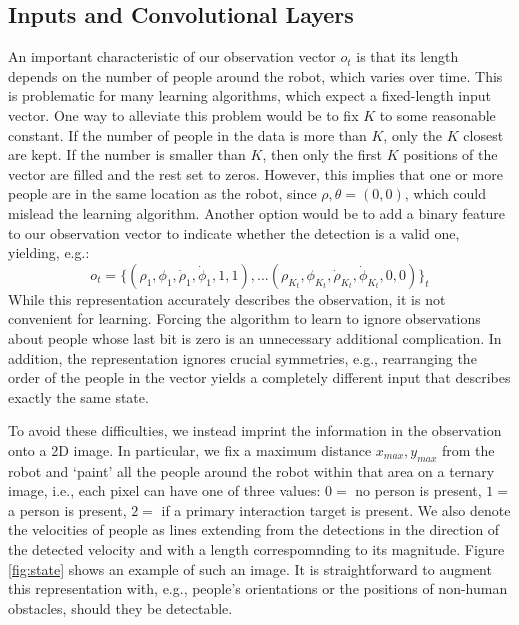 \documentclass[letterpaper, 10 pt, conference]{ieeeconf}
\begin{document}
\subsection{Inputs and Convolutional Layers \label{subsec:meth_inp}}
%
An important characteristic of our observation vector $o_t$ is that its length depends on
 the number of people around the robot, which varies over time.  This is problematic for many
learning algorithms, which expect a fixed-length input vector. One way to alleviate this problem would be to fix $K$ to some reasonable constant. If the number of people in the data is more than $K$, only the $K$ closest are kept. If the number is smaller than $K$, then only the first $K$ positions of the vector are filled and the rest set to zeros. However, this implies that one or more people are in the same location as the robot, since $\rho,\theta = (0,0)$, which could mislead the learning algorithm.  Another option would be to add a binary feature to our observation vector to indicate whether the detection is a valid one, yielding, e.g.:
\begin{equation}
 	o_t = \{(\rho_1,\phi_1,\dot{\rho}_1,\dot{\phi}_1,1,1),... (\rho_{K_t},\phi_{K_t},\dot{\rho}_{K_t},\dot{\phi}_{K_t},0,0)\}_t
\end{equation}
While this representation accurately describes the observation, it is not convenient for learning.  Forcing the algorithm to learn to ignore observations about people whose last bit is zero is an unnecessary additional complication.  In addition, the representation ignores crucial symmetries, e.g., rearranging the order of the people in the vector yields a completely different input that describes exactly the same state.

To avoid these difficulties, we instead imprint the information in the observation onto a 2D image. In particular, we fix a maximum distance $x_{max},y_{max}$ from the robot and `paint' all the people around the robot within that area on a ternary image, i.e., each pixel can have one of three values: $0=$ no person is present, $1=$ a person is present, $2=$ if a primary interaction target is present. We also denote the velocities of people as lines extending from the detections in the direction of the detected velocity and with a length correspomnding to its magnitude. Figure \ref{fig:state} shows an example of such an image.  It is straightforward to augment this representation with, e.g., people's orientations or the positions of non-human obstacles, should they be detectable.
\end{document}
